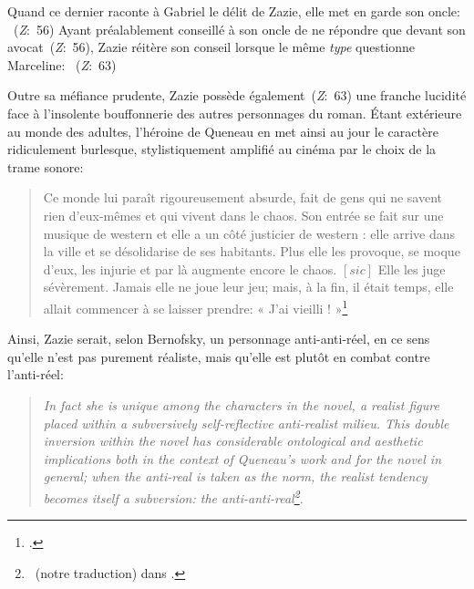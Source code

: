 Quand ce dernier raconte à Gabriel le délit de Zazie, elle met en garde son oncle: ~(\textit{Z}:~56)
Ayant préalablement conseillé à son oncle de ne répondre que devant son avocat~(\textit{Z}:~56), Zazie réitère son conseil lorsque le même \textit{type} questionne Marceline: ~(\textit{Z}:~63)
\par
Outre sa méfiance prudente, Zazie possède également~(\textit{Z}:~63) une franche lucidité face à l'insolente bouffonnerie des autres personnages du roman.
Étant extérieure au monde des adultes, l'héroine de Queneau en met ainsi au jour le caractère ridiculement burlesque, stylistiquement amplifié au cinéma par le choix de la trame sonore:
\begin{quote}
  \begin{singlespace}
    \small
    Ce monde lui paraît rigoureusement absurde, fait de gens qui ne savent rien d'eux-mêmes et qui vivent dans le chaos. Son entrée se fait sur une musique de western et elle a un côté justicier de western : elle arrive dans la ville et se désolidarise de ses habitants. Plus elle les provoque, se moque d'eux, les injurie et par là augmente encore le chaos. $\left[ \textit{sic} \right]$ Elle les juge sévèrement. Jamais elle ne joue leur jeu; mais, à la fin, il était temps, elle allait commencer à se laisser prendre: « J'ai vieilli ! »\footcite{Gilson1960}
    \normalsize
  \end{singlespace}
\end{quote}
Ainsi, Zazie serait, selon Bernofsky, un personnage anti-anti-réel, en ce sens qu'elle n'est pas purement réaliste, mais qu'elle est plutôt en combat contre l'anti-réel:
\begin{quote}
  \begin{singlespace}
    \small
    \textit{In fact she is unique among the characters in the novel, a realist figure placed within a subversively self-reflective anti-realist milieu. This double inversion within the novel has considerable ontological and aesthetic implications both in the context of Queneau's work and for the novel in general; when the anti-real is taken as the norm, the realist tendency becomes itself a subversion: the anti-anti-real\footnote{~(notre traduction) dans \mancite \cite[115]{Bernofsky1994}.}.}
    \normalsize
  \end{singlespace}
\end{quote}
